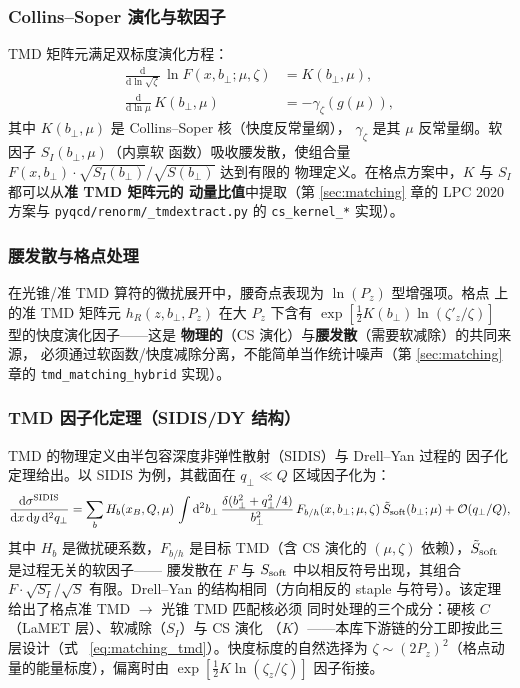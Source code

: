 \documentclass[11pt,a4paper]{ctexart}
\newcommand{\order}[1]{\mathcal{O}(#1)}
\newcommand{\code}[1]{\texttt{#1}}
\newcommand{\bperp}{b_{\perp}}
\begin{document}
\subsubsection{Collins--Soper 演化与软因子}

TMD 矩阵元满足双标度演化方程：
\begin{align}
\frac{\mathrm{d}}{\mathrm{d}\ln\sqrt{\zeta}}\,
\ln F(x,\bperp;\mu,\zeta) &= K(\bperp,\mu), \\
\frac{\mathrm{d}}{\mathrm{d}\ln\mu}\, K(\bperp,\mu)
&= -\gamma_\zeta(g(\mu)),
\end{align}
其中 $K(b_\perp,\mu)$ 是 Collins--Soper 核（快度反常量纲），
$\gamma_\zeta$ 是其 $\mu$ 反常量纲。软因子 $S_I(b_\perp,\mu)$（内禀软
函数）吸收腰发散，使组合量
$F(x,b_\perp) \cdot \sqrt{S_I(b_\perp)}/\sqrt{S(b_\perp)}$ 达到有限的
物理定义。在格点方案中，$K$ 与 $S_I$ 都可以从\textbf{准 TMD 矩阵元的
动量比值}中提取（第 \ref{sec:matching} 章的 LPC 2020 方案与
\code{pyqcd/renorm/\_tmdextract.py} 的 \code{cs\_kernel\_*} 实现）。

\subsubsection{腰发散与格点处理}

在光锥/准 TMD 算符的微扰展开中，腰奇点表现为 $\ln(P_z)$ 型增强项。格点
上的准 TMD 矩阵元 $h_R(z,\bperp,P_z)$ 在大 $P_z$ 下含有
$\exp[\tfrac12 K(b_\perp)\ln(\zeta'_{z}/\zeta)]$ 型的快度演化因子——这是
\textbf{物理的}（CS 演化）与\textbf{腰发散}（需要软减除）的共同来源，
必须通过软函数/快度减除分离，不能简单当作统计噪声（第
\ref{sec:matching} 章的 \code{tmd\_matching\_hybrid} 实现）。

\subsubsection{TMD 因子化定理（SIDIS/DY 结构）}

TMD 的物理定义由半包容深度非弹性散射（SIDIS）与 Drell--Yan 过程的
因子化定理给出。以 SIDIS 为例，其截面在 $q_\perp\ll Q$ 区域因子化为：
\begin{equation}\label{eq:tmd-factorization}
\frac{\mathrm{d}\sigma^{\rm SIDIS}}{\mathrm{d}x\,\mathrm{d}y\,
\mathrm{d}^2 q_\perp}
= \sum_b H_b(x_B,Q,\mu)\,
\int \mathrm{d}^2\bperp\,\frac{\delta(\bperp^2+q_\perp^2/4)}
{\bperp^2}\,
F_{b/h}(x,\bperp;\mu,\zeta)\,
\tilde S_{\rm soft}(\bperp;\mu)
+ \order{q_\perp/Q},
\end{equation}
其中 $H_b$ 是微扰硬系数，$F_{b/h}$ 是目标 TMD（含 CS 演化的
$(\mu,\zeta)$ 依赖），$\tilde S_{\rm soft}$ 是过程无关的软因子——
腰发散在 $F$ 与 $S_{\rm soft}$ 中以相反符号出现，其组合
$F\cdot\sqrt{S_I}/\sqrt{S}$ 有限。Drell--Yan 的结构相同（方向相反的
staple 与符号）。该定理给出了格点准 TMD $\to$ 光锥 TMD 匹配核必须
同时处理的三个成分：硬核 $C$（LaMET 层）、软减除（$S_I$）与 CS 演化
（$K$）——本库下游链的分工即按此三层设计（式
~\eqref{eq:matching_tmd}）。快度标度的自然选择为
$\zeta\sim(2P_z)^2$（格点动量的能量标度），偏离时由
$\exp[\tfrac12 K\ln(\zeta_z/\zeta)]$ 因子衔接。
\end{document}
